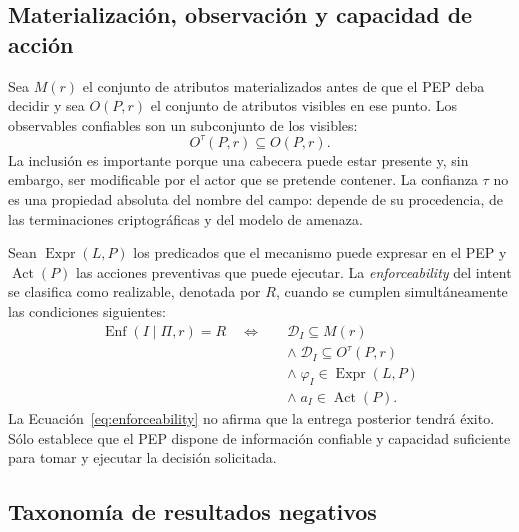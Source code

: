\subsection{Materialización, observación y capacidad de acción}
\label{subsec:condiciones-enforceability}

Sea $M(r)$ el conjunto de atributos materializados antes de que el PEP deba decidir y sea $O(P,r)$ el conjunto de atributos visibles en ese punto. Los observables confiables son un subconjunto de los visibles:
\begin{equation}
    O^{\tau}(P,r) \subseteq O(P,r).
    \label{eq:observables-confiables}
\end{equation}
%
La inclusión es importante porque una cabecera puede estar presente y, sin embargo, ser modificable por el actor que se pretende contener. La confianza $\tau$ no es una propiedad absoluta del nombre del campo: depende de su procedencia, de las terminaciones criptográficas y del modelo de amenaza.

Sean $\operatorname{Expr}(L,P)$ los predicados que el mecanismo puede expresar en el PEP y $\operatorname{Act}(P)$ las acciones preventivas que puede ejecutar. La \textit{enforceability} del intent se clasifica como realizable, denotada por $R$, cuando se cumplen simultáneamente las condiciones siguientes:
\begin{equation}
\begin{split}
    \operatorname{Enf}(I\mid\Pi,r)=R \quad \Longleftrightarrow \quad
    &\mathcal{D}_{I} \subseteq M(r) \\
    &\land\; \mathcal{D}_{I} \subseteq O^{\tau}(P,r) \\
    &\land\; \varphi_{I} \in \operatorname{Expr}(L,P) \\
    &\land\; a_{I} \in \operatorname{Act}(P).
\end{split}
    \label{eq:enforceability}
\end{equation}
%
La Ecuación~\ref{eq:enforceability} no afirma que la entrega posterior tendrá éxito. Sólo establece que el PEP dispone de información confiable y capacidad suficiente para tomar y ejecutar la decisión solicitada.

\subsection{Taxonomía de resultados negativos}
\label{subsec:taxonomia-resultados}

